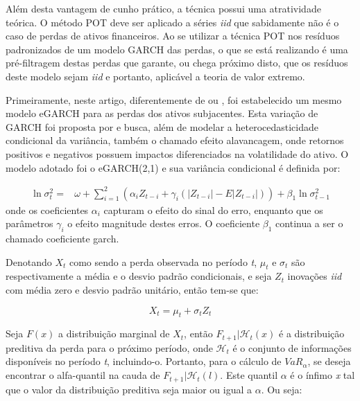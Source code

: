\documentclass[review]{elsarticle}
\theoremstyle{definition}
\begin{document}
Além desta vantagem de cunho prático, a técnica possui uma atratividade teórica. O método POT deve ser aplicado a séries \emph{iid} que sabidamente não é o caso de perdas de ativos financeiros. Ao se utilizar a técnica POT nos resíduos padronizados de um modelo GARCH das perdas, o que se está realizando é uma pré-filtragem destas perdas que garante, ou chega próximo disto, que os resíduos deste modelo sejam \emph{iid} e portanto, aplicável a teoria de valor extremo. 

Primeiramente, neste artigo, diferentemente de \cite{McNeil2000} ou \cite{Karmakar2014}, foi estabelecido um mesmo modelo eGARCH para as perdas dos ativos subjacentes. Esta variação de GARCH foi proposta por \cite{Nelson1991} e busca, além de modelar a heterocedasticidade condicional da variância, também o chamado efeito alavancagem, onde retornos positivos e negativos possuem impactos diferenciados na volatilidade do ativo. O modelo adotado foi o eGARCH(2,1) e sua variância condicional é definida por:

\begin{align}
\label{eq:egarch}
\ln\sigma_t^2=&\omega+ \sum_{i=1}^{2}\left(\alpha_i Z_{t-i}+ \gamma_i(|Z_{t-i}|-E|Z_{t-i}|)\right)+ \beta_1 \ln\sigma_{t-1}^2
\end{align}
onde os coeficientes $\alpha_i$ capturam o efeito do sinal do erro, enquanto que os parâmetros $\gamma_i$ o efeito magnitude destes erros. O coeficiente $\beta_1$ continua a ser o chamado coeficiente garch. %


Denotando $X_t$ como sendo a perda observada no período \emph{t}, $\mu_t$ e $\sigma_t$ são respectivamente a média e o desvio padrão condicionais, e seja $Z_t$ inovações \emph{iid} com média zero e desvio padrão unitário, então tem-se que:

\begin{equation}
\label{eq:loss}
X_t=\mu_t+\sigma_t Z_t
\end{equation}

Seja $F(x)$ a distribuição marginal de $X_t$, então $F_{t+1} | \mathcal{H}_t(x)$ é a distribuição preditiva da perda para o próximo período, onde $\mathcal{H}_t$ é o conjunto de informações disponíveis no período \emph{t}, incluindo-o. Portanto, para o cálculo de $VaR_\alpha$, se deseja encontrar o alfa-quantil na cauda de $F_{t+1} | \mathcal{H}_t(l)$. Este quantil $\alpha$ é o ínfimo \emph{x} tal que o valor da distribuição preditiva seja maior ou igual a $\alpha$. Ou seja:
\end{document}
